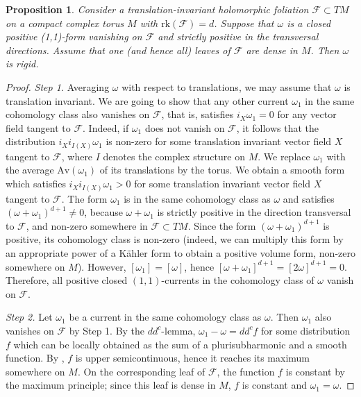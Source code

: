 \documentclass[11pt]{article}
\newcommand{\6}{\partial}
\def\cal{\mathcal}
\newcommand{\FF}{\mathcal{F}}
\newcommand{\Av}{\mathrm{Av}}
\newtheorem{prop}[defn]{Proposition}
\begin{document}

\begin{prop}\label{_rigid_on_torus_Proposition_}
Consider a translation-invariant
holomorphic foliation ${\cal F}\subset TM$ on
a compact complex torus $M$ with $\mathrm{rk}(\FF) = d$. Suppose that
$\omega$ is a closed positive (1,1)-form vanishing on ${\cal F}$
and strictly positive in the transversal directions.
Assume that one (and hence all) leaves of
${\cal F}$ are dense in $M$. Then $\omega$ is rigid.
\end{prop}
\begin{proof}{\em Step 1.}
Averaging $\omega$
with respect to translations, we may assume that
$\omega$ is translation invariant. We are going to show that any other
current $\omega_1$ in the same cohomology class also vanishes
on ${\cal F}$, that is, satisfies $i_X \omega_1=0$ for
any vector field tangent to ${\cal F}$. Indeed, if
$\omega_1$ does not vanish on ${\cal F}$,
it follows that the distribution
$i_{X} i_{I(X)} \omega_1$ is non-zero for some translation
invariant vector field $X$ tangent to ${\cal F}$,
where $I$ denotes the complex structure on $M$.
We replace $\omega_1$ with the average $\Av(\omega_1)$
of its translations by the torus.
We obtain a smooth form which satisfies $i_{X} i_{I(X)} \omega_1>0$
for some translation invariant vector field $X$ tangent to
${\cal F}$. The form $\omega_1$ is in the same cohomology class as $\omega$
and satisfies $(\omega+ \omega_1)^{d+1}\neq 0$,
because $\omega+\omega_1$ is strictly positive in 
the direction transversal to $\FF$, and non-zero
somewhere in $\FF\subset TM$. Since the form $(\omega+
\omega_1)^{d+1}$
is positive, its cohomology class is non-zero
(indeed, we can multiply this form by an appropriate
power of a K\"ahler form to obtain a positive 
volume form, non-zero somewhere on $M$).
However, $[\omega_1] = [\omega]$,
hence $[\omega+\omega_1]^{d+1} = [2\omega]^{d+1} = 0$.
Therefore, all positive closed $(1,1)$-currents in the cohomology
class of $\omega$ vanish on ${\cal F}$.

{\em Step 2.}
Let $\omega_1$ be a current in the same cohomology class
as $\omega$. Then $\omega_1$ also vanishes on ${\cal F}$ by Step 1.
By the $dd^c$-lemma, $\omega_1 - \omega= dd^c f$ for some distribution $f$
which can be locally obtained as the sum of a plurisubharmonic
and a smooth function. By  \cite[Theorem A.5]{HL}, $f$ is upper semicontinuous,
hence it reaches its maximum somewhere on $M$. On the corresponding
leaf of ${\cal F}$, the function $f$ is constant by the maximum
principle; since this leaf is dense in $M$, $f$ is constant and $\omega_1 = \omega$.
\end{proof}
\end{document}

